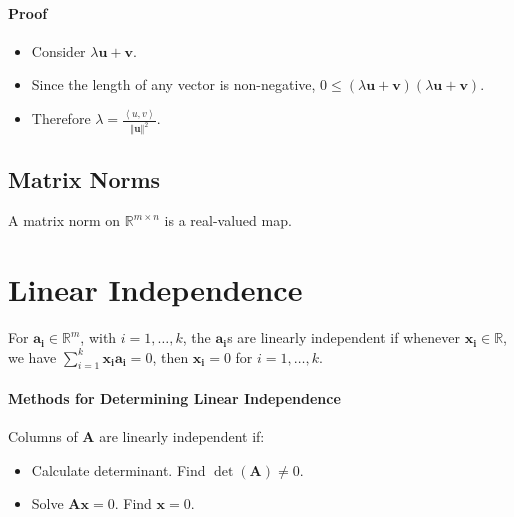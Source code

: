 \documentclass[twocolumn,english]{article}
\begin{document}
\paragraph{Proof}
\begin{itemize}
\item Consider $\lambda\boldsymbol{u}+\boldsymbol{v}$.
\item Since the length of any vector is non-negative, $0\leq\left(\lambda\boldsymbol{u}+\boldsymbol{v}\right)\left(\lambda\boldsymbol{u}+\boldsymbol{v}\right)$.
\item Therefore $\lambda=\frac{\left\langle u,v\right\rangle }{\left\Vert \boldsymbol{u}\right\Vert ^{2}}$.
\end{itemize}

\subsection{Matrix Norms}

A matrix norm on $\mathbb{R}^{m\times n}$ is a real-valued map.

\section{Linear Independence}

For $\boldsymbol{a_{i}}\in\mathbb{R}^{m}$, with $i=1,\dots,k$, the
$\boldsymbol{a_{i}}$s are linearly independent if whenever $\boldsymbol{x_{i}}\in\mathbb{R}$,
we have $\sum_{i=1}^{k}\boldsymbol{x_{i}}\boldsymbol{a_{i}}=0$, then
$\boldsymbol{x_{i}}=0$ for $i=1,\dots,k$\@.

\paragraph{Methods for Determining Linear Independence}

Columns of $\boldsymbol{A}$ are linearly independent if:
\begin{itemize}
\item Calculate determinant. Find $\det\left(\boldsymbol{A}\right)\neq0$.
\item Solve $\boldsymbol{Ax}=0$. Find $\boldsymbol{x}=0$.
\end{itemize}
\end{document}
